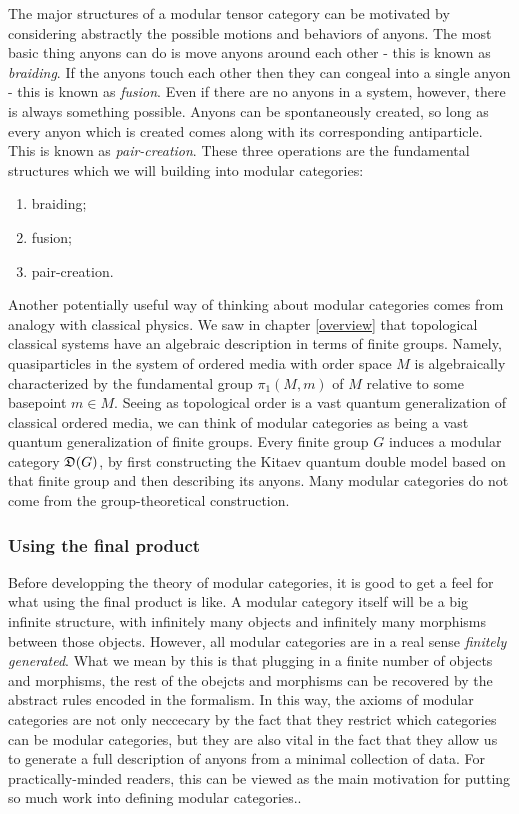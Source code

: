 \begin{rem}
The major structures of a modular tensor category can be motivated by considering abstractly the possible motions and behaviors of anyons. The most basic thing anyons can do is move anyons around each other - this is known as {\em braiding}. If the anyons touch each other then they can congeal into a single  anyon - this is known as {\em fusion}. Even if there are no anyons in a system, however, there is always something possible. Anyons can be spontaneously created, so long as every anyon which is created comes along with its corresponding antiparticle. This is known as {\em pair-creation}. These three operations are the fundamental structures which we will building into modular categories:

\begin{enumerate}
\item braiding;
\item fusion;
\item pair-creation.
\end{enumerate}
\end{rem}

\begin{rem}
Another potentially useful way of thinking about modular categories comes from analogy with classical physics. We saw in chapter \ref{overview} that topological classical systems have an algebraic description in terms of finite groups. Namely, quasiparticles in the system of ordered media with order space $M$ is algebraically characterized by the fundamental group $\pi_1(M,m)$ of $M$ relative to some basepoint $m\in M$. Seeing as topological order is a vast quantum generalization of classical ordered media, we can think of modular categories as being a vast quantum generalization of finite groups. Every finite group $G$ induces a modular category ${\mathfrak D}(G)$, by first constructing the Kitaev quantum double model based on that finite group and then describing its anyons. Many modular categories do not come from the group-theoretical construction.
\end{rem}

\subsubsection{Using the final product}

Before developping the theory of modular categories, it is good to get a feel for what using the final product is like. A modular category itself will be a big infinite structure, with infinitely many objects and infinitely many morphisms between those objects. However, all modular categories are in a real sense \textit{finitely generated}. What we mean by this is that plugging in a finite number of objects and morphisms, the rest of the obejcts and morphisms can be recovered by the abstract rules encoded in the formalism. In this way, the axioms of modular categories are not only neccecary by the fact that they restrict which categories can be modular categories, but they are also vital in the fact that they allow us to generate a full description of anyons from a minimal collection of data. For practically-minded readers, this can be viewed as the main motivation for putting so much work into defining modular categories..

